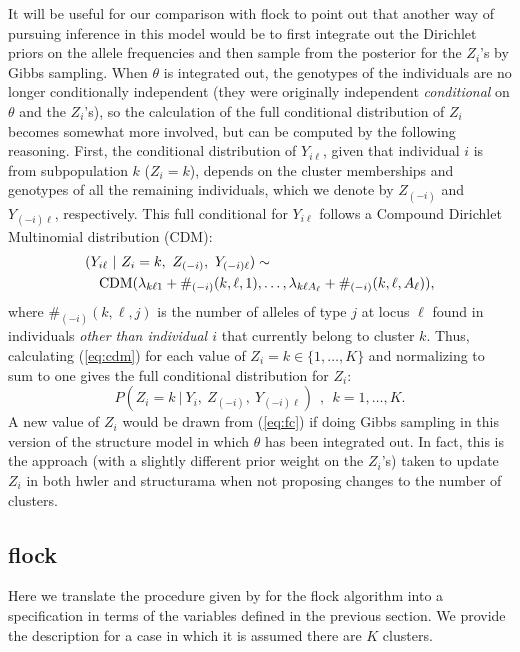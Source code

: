 It will be useful for our comparison with {\sc flock} to point out that another way 
of pursuing inference in this model would be to first integrate out the 
Dirichlet priors on the allele frequencies and then sample from the posterior
for the $Z_i$'s by Gibbs sampling.  When $\theta$ is integrated out, the genotypes 
of the individuals are no longer conditionally independent (they were originally
independent {\em conditional} on $\theta$ and the $Z_i$'s), so the calculation of 
the full conditional distribution of $Z_i$ becomes somewhat more involved,
but can be computed by the following reasoning. First, the 
conditional distribution of $Y_{i\ell}$, given that individual $i$ is from subpopulation $k$
(\ie $Z_i=k$), depends on the 
cluster memberships and genotypes  of all the remaining individuals,
which we denote by  $Z_{(-i)}$ and $Y_{(-i)\ell}$, respectively.
This full conditional for $Y_{i\ell}$ follows 
a Compound Dirichlet Multinomial distribution (CDM):
\begin{eqnarray}
\lefteqn{(Y_{i\ell}~|~Z_i=k,~Z_{(-i)},~Y_{(-i)\ell}) \sim} \label{eq:cdm}\\
& & \mathrm{CDM}(\lambda_{k\ell 1} + \#_{(-i)}(k,\ell,1), \ldots,
\lambda_{k\ell A_\ell} + \#_{(-i)}(k,\ell,A_\ell)), \nonumber
\end{eqnarray}
where $\#_{(-i)}(k,\ell,j)$ is the number of alleles of type $j$ at locus $\ell$
found in individuals {\em other than individual $i$} that currently
belong to cluster $k$. Thus, calculating (\ref{eq:cdm}) for each value of $Z_i=k \in 
\{1,\ldots,K\}$ 
and normalizing to sum to one gives the full conditional distribution for 
$Z_i$:
\begin{equation}
P(Z_i=k~|~Y_i, ~Z_{(-i)},~Y_{(-i)\ell})~~,~~k=1,\ldots,K.
\label{eq:fc}
\end{equation}
A new value of $Z_i$ would be drawn from (\ref{eq:fc}) if doing Gibbs sampling in this
version of the {\sc structure} model in which $\theta$ has been integrated out.  In 
fact,
this is the approach (with a slightly different prior weight on the $Z_i$'s) taken to 
update 
$Z_i$ in both {\sc hwler} \citep{Pel&Mas2006} and {\sc structurama} \citep{Hue&And2007} 
when not
proposing changes to the number of clusters.



\subsection*{{\sc flock}}
Here we translate the procedure given by \citet{Duc&Tur2009} for the 
{\sc flock} algorithm into a specification in terms of the variables
defined in the previous section.  We provide the description for a case in which
it is assumed there are $K$ clusters.


